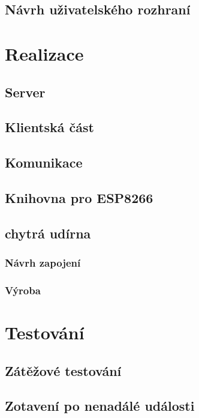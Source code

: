 \documentclass[thesis=B,czech]{FITthesis}[2019/12/23]
\begin{document}
\section{Návrh uživatelského rozhraní}




\chapter{Realizace}

\section{Server}

\section{Klientská část}

\section{Komunikace}

\section{Knihovna pro ESP8266}

\section{chytrá udírna}

\subsection{Návrh zapojení}

\subsection{Výroba}



\chapter{Testování}

\section{Zátěžové testování}

\section{Zotavení po nenadálé události}
\end{document}
